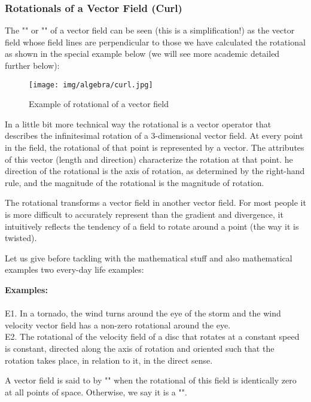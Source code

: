 	\subsubsection{Rotationals of a Vector Field (Curl)}\label{rotational}
	The "" or "" of a vector field can be seen (this is a simplification!) as the vector field whose field lines are perpendicular to those we have calculated the rotational as shown in the special example below (we will see more academic detailed further below):
	\begin{figure}[H]
	\centering
		\texttt{[image: img/algebra/curl.jpg]}
		\caption{Example of rotational of a vector field}
	\end{figure}
	In a little bit more technical way the rotational is a vector operator that describes the infinitesimal rotation of a $3$-dimensional vector field. At every point in the field, the rotational of that point is represented by a vector. The attributes of this vector (length and direction) characterize the rotation at that point. he direction of the rotational is the axis of rotation, as determined by the right-hand rule, and the magnitude of the rotational is the magnitude of rotation. 
	
	The rotational transforms a vector field in another vector field. For most people it is more difficult to accurately represent than the gradient and divergence, it intuitively reflects the tendency of a field to rotate around a point (the way it is twisted).
	
	Let us give before tackling with the mathematical stuff and also mathematical examples two every-day life examples:
	\begin{tcolorbox}[colframe=black,colback=white,sharp corners]
	\textbf{{\Large {}}Examples:}\\\\
	E1. In a tornado, the wind turns around the eye of the storm and the wind velocity vector field has a non-zero rotational around the eye.\\

	E2. The rotational of the velocity field of a disc that rotates at a constant speed is constant, directed along the axis of rotation and oriented such that the rotation takes place, in relation to it, in the direct sense.\\
	\end{tcolorbox}
	A vector field is said to by "\label{irrotational}" when the rotational of this field is identically zero at all points of space. Otherwise, we say it is a "".
	

